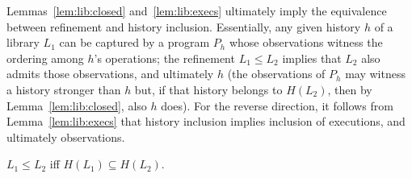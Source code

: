%
%


Lemmas~\ref{lem:lib:closed} and~\ref{lem:lib:execs} ultimately imply the
equivalence between refinement and history inclusion. Essentially, any given
history $h$ of a library $L_1$ can be captured by a program $P_h$ whose
observations witness the ordering among $h$'s operations; the refinement $L_1
\leq L_2$ implies that $L_2$ also admits those observations, and ultimately
$h$ \alert{(the observations of $P_h$ may witness a history stronger than $h$
but, if that history belongs to $H(L_2)$, then by Lemma~\ref{lem:lib:closed}, also $h$ does)}. 
For the reverse direction, it follows from Lemma~\ref{lem:lib:execs} that
history inclusion implies inclusion of executions, and ultimately observations.

\begin{theorem}
  \label{thm:equivalence}

  $L_1 \leq L_2$ if{f} $H(L_1) \subseteq H(L_2)$.

\end{theorem}

